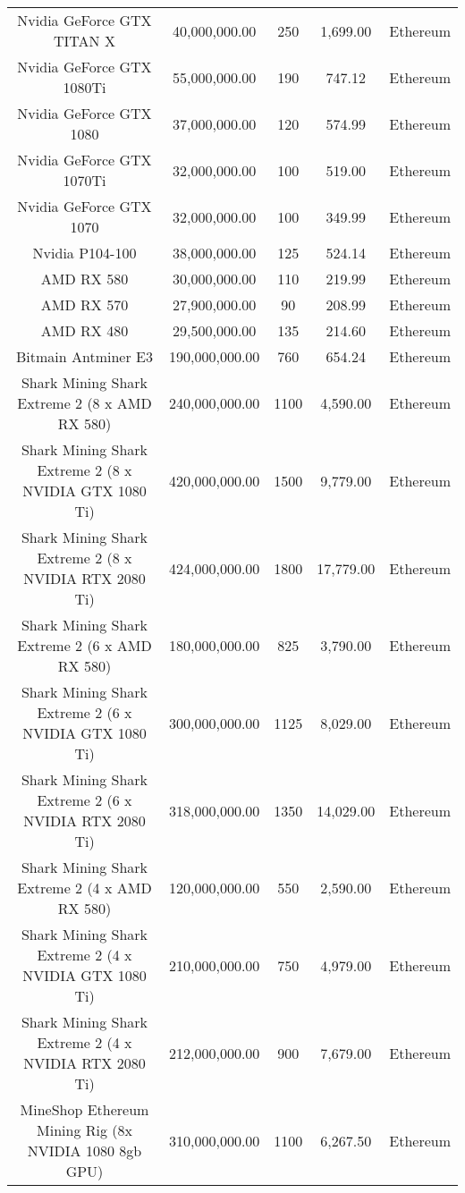 \begin{table}[!ht]
{\begin{tabular}{|c|c|c|c|c|}
        Nvidia GeForce GTX TITAN X & 40,000,000.00 & 250 & 1,699.00 & Ethereum \\
        Nvidia GeForce GTX 1080Ti & 55,000,000.00 & 190 & 747.12 & Ethereum \\
        Nvidia GeForce GTX 1080 & 37,000,000.00 & 120 & 574.99 & Ethereum \\
        Nvidia GeForce GTX 1070Ti & 32,000,000.00 & 100 & 519.00 & Ethereum \\
        Nvidia GeForce GTX 1070 & 32,000,000.00 & 100 & 349.99 & Ethereum \\
        Nvidia P104-100 & 38,000,000.00 & 125 & 524.14 & Ethereum \\
        AMD RX 580 & 30,000,000.00 & 110 & 219.99 & Ethereum \\
        AMD RX 570 & 27,900,000.00 & 90 & 208.99 & Ethereum \\
        AMD RX 480 & 29,500,000.00 & 135 & 214.60 & Ethereum \\
        Bitmain Antminer E3 & 190,000,000.00 & 760 & 654.24 & Ethereum \\
        Shark Mining Shark Extreme 2 (8 x AMD RX 580) & 240,000,000.00 & 1100 & 4,590.00 & Ethereum \\
        Shark Mining Shark Extreme 2 (8 x NVIDIA GTX 1080 Ti) & 420,000,000.00 & 1500 & 9,779.00 & Ethereum \\
        Shark Mining Shark Extreme 2 (8 x NVIDIA RTX 2080 Ti) & 424,000,000.00 & 1800 & 17,779.00 & Ethereum \\
        Shark Mining Shark Extreme 2 (6 x AMD RX 580) & 180,000,000.00 & 825 & 3,790.00 & Ethereum \\
        Shark Mining Shark Extreme 2 (6 x NVIDIA GTX 1080 Ti) & 300,000,000.00 & 1125 & 8,029.00 & Ethereum \\
        Shark Mining Shark Extreme 2 (6 x NVIDIA RTX 2080 Ti) & 318,000,000.00 & 1350 & 14,029.00 & Ethereum \\
        Shark Mining Shark Extreme 2 (4 x AMD RX 580) & 120,000,000.00 & 550 & 2,590.00 & Ethereum \\
        Shark Mining Shark Extreme 2 (4 x NVIDIA GTX 1080 Ti) & 210,000,000.00 & 750 & 4,979.00 & Ethereum \\
        Shark Mining Shark Extreme 2 (4 x NVIDIA RTX 2080 Ti) & 212,000,000.00 & 900 & 7,679.00 & Ethereum \\
        MineShop Ethereum Mining Rig (8x NVIDIA 1080 8gb GPU) & 310,000,000.00 & 1100 & 6,267.50 & Ethereum \\

\end{tabular}}
\end{table}
